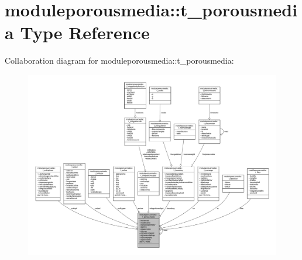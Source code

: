 \hypertarget{structmoduleporousmedia_1_1t__porousmedia}{}\section{moduleporousmedia\+:\+:t\+\_\+porousmedia Type Reference}
\label{structmoduleporousmedia_1_1t__porousmedia}


Collaboration diagram for moduleporousmedia\+:\+:t\+\_\+porousmedia\+:\nopagebreak
\begin{figure}[H]
\begin{center}
\leavevmode
\includegraphics[width=350pt]{structmoduleporousmedia_1_1t__porousmedia__coll__graph}
\end{center}
\end{figure}
